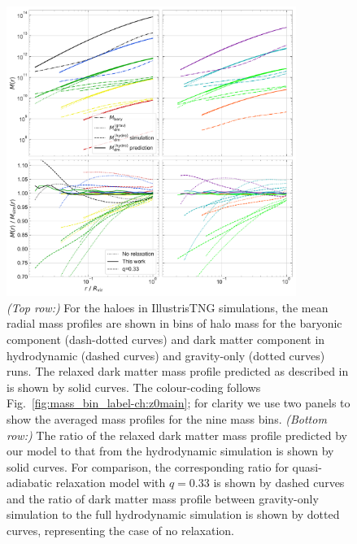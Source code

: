     
    










\begin{figure}
    \centering
    \includegraphics[width=0.84\textwidth]{plots/Mass-prof_with_demo_accu-1.pdf}
    \caption{\emph{(Top row:)} For the haloes in IllustrisTNG simulations, the mean radial mass profiles are shown in bins of halo mass for the baryonic component (dash-dotted curves) and dark matter component in hydrodynamic (dashed curves) and gravity-only (dotted curves) runs.  The relaxed dark matter mass profile predicted as described in  is shown by solid curves. The colour-coding follows Fig.~\ref{fig:mass_bin_label-ch:z0main}; for clarity we use two panels to show the averaged mass profiles for the nine mass bins. 
    \emph{(Bottom row:)} The ratio of the relaxed dark matter mass profile predicted by our model to that from the hydrodynamic simulation is shown by solid curves. For comparison, the corresponding ratio for quasi-adiabatic relaxation model with $q=0.33$ is shown by dashed curves and the ratio of dark matter mass profile between gravity-only simulation to the full hydrodynamic simulation is shown by dotted curves, representing the case of no relaxation. } 
    \label{fig:demo-fit-ch:z0main}
\end{figure}





